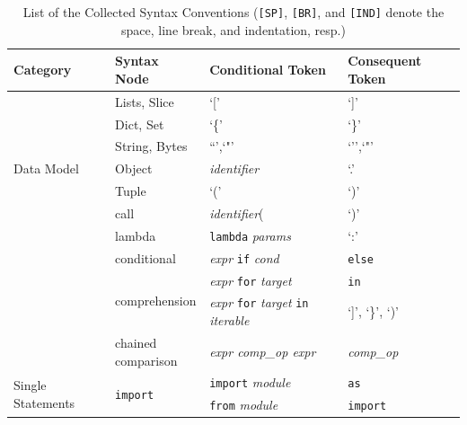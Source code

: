 \documentclass[letterpaper]{article} %
\theoremstyle{acmdefinition}
\begin{document}
\begin{table}[!t]
    \centering
    \footnotesize
    \caption{List of the Collected Syntax Conventions (\texttt{[SP]}, \texttt{[BR]}, and \texttt{[IND]} denote the space, line break, and indentation, resp.)}\label{table:syntax_full}
    \begin{tabular}{m{2.8cm}m{2cm}m{6.5cm}m{5cm}}
        \toprule
        \textbf{Category} &\textbf{Syntax Node}  & \textbf{Conditional Token} & \textbf{Consequent Token} \\
        \midrule
        
        \multirow{7}{*}{Data Model}  & Lists, Slice & `[' & `]' \\
        \cmidrule{2-4}
            & Dict, Set &  `\{' & `\}' \\
            \cmidrule{2-4}
            & String, Bytes  & ``',`"' &   `'',`"'  \\
            \cmidrule{2-4}
            & Object & \textit{identifier} & `.' \\
            \cmidrule{2-4}
            & Tuple & `(' & `)' \\\hline
        \multirow{6}{*}{Expressions} & call & \textit{identifier}( & `)' \\
        \cmidrule{2-4}
            & lambda & \texttt{lambda} \textit{params} & `:' \\
        \cmidrule{2-4}
            & conditional & \textit{expr} \texttt{if} \textit{cond} & \texttt{else} \\
        \cmidrule{2-4}
            & \multirow{2}{*}{comprehension} & \textit{expr} \texttt{for} \textit{target} & \texttt{in}  \\
        \cmidrule{3-4}
            & & \textit{expr} \texttt{for} \textit{target} \texttt{in} \textit{iterable} & `]', `\}', `)'  \\
        \cmidrule{2-4}
            & \shortstack[l]{chained\\comparison} & \textit{expr comp\_op expr} & \textit{comp\_op} \\\hline
        \multirow{4}{*}{Single Statements} 
        & \multirow{2}{*}{\texttt{import}} & \texttt{import} \textit{module}  & \texttt{as} \\
        \cmidrule{3-4}
        & & \texttt{from} \textit{module} & \texttt{import} \\

\end{tabular}
\end{table}
\end{document}
